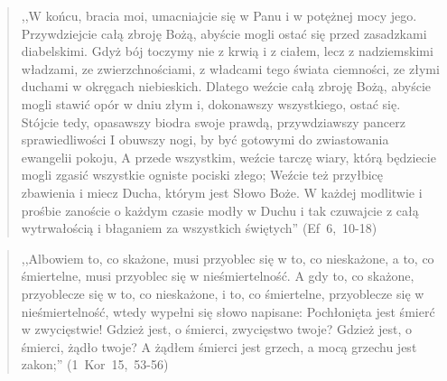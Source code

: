 \documentclass[10pt,a4paper,oneside]{article}
\begin{document}
\begin{quote}
,,W końcu, bracia moi, umacniajcie się w Panu i w potężnej mocy jego. Przywdziejcie całą zbroję Bożą, abyście mogli ostać się przed zasadzkami diabelskimi. Gdyż bój toczymy nie z krwią i z ciałem, lecz z nadziemskimi władzami, ze zwierzchnościami, z władcami tego świata ciemności, ze złymi duchami w okręgach niebieskich. Dlatego weźcie całą zbroję Bożą, abyście mogli stawić opór w dniu złym i, dokonawszy wszystkiego, ostać się. Stójcie tedy, opasawszy biodra swoje prawdą, przywdziawszy pancerz sprawiedliwości I obuwszy nogi, by być gotowymi do zwiastowania ewangelii pokoju, A przede wszystkim, weźcie tarczę wiary, którą będziecie mogli zgasić wszystkie ogniste pociski złego; Weźcie też przyłbicę zbawienia i miecz Ducha, którym jest Słowo Boże. W każdej modlitwie i prośbie zanoście o każdym czasie modły w Duchu i tak czuwajcie z całą wytrwałością i błaganiem za wszystkich świętych'' (Ef~6,~10-18)
\end{quote}
\begin{quote}
,,Albowiem to, co skażone, musi przyoblec się w to, co nieskażone, a to, co śmiertelne, musi przyoblec się w nieśmiertelność. A gdy to, co skażone, przyoblecze się w to, co nieskażone, i to, co śmiertelne, przyoblecze się w nieśmiertelność, wtedy wypełni się słowo napisane: Pochłonięta jest śmierć w zwycięstwie! Gdzież jest, o śmierci, zwycięstwo twoje? Gdzież jest, o śmierci, żądło twoje? A żądłem śmierci jest grzech, a mocą grzechu jest zakon;'' (1~Kor~15,~53-56)
\end{quote}
\end{document}
